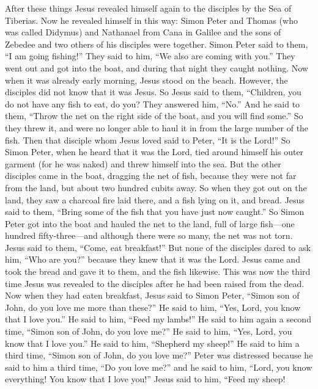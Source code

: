 \begin{biblechapter} %
 After these things Jesus revealed himself again to the disciples by the Sea of Tiberias. Now he revealed himself in this way:
\verse Simon Peter and Thomas (who was called Didymus) and Nathanael from Cana in Galilee and the sons of Zebedee and two others of his disciples were together.
\verse Simon Peter said to them, “I am going fishing!” They said to him, “We also are coming with you.” They went out and got into the boat, and during that night they caught nothing.
\verse Now when it was already early morning, Jesus stood on the beach. However, the disciples did not know that it was Jesus.
\verse So Jesus said to them, “Children, you do not have any fish to eat, do you? They answered him, “No.”
\verse And he said to them, “Throw the net on the right side of the boat, and you will find some.” So they threw it, and were no longer able to haul it in from the large number of the fish.
\verse Then that disciple whom Jesus loved said to Peter, “It is the Lord!” So Simon Peter, when he heard that it was the Lord, tied around himself his outer garment (for he was naked) and threw himself into the sea.
\verse But the other disciples came in the boat, dragging the net of fish, because they were not far from the land, but about two hundred cubits away.
\verse So when they got out on the land, they saw a charcoal fire laid there, and a fish lying on it, and bread.
\verse Jesus said to them, “Bring some of the fish that you have just now caught.”
\verse So Simon Peter got into the boat and hauled the net to the land, full of large fish—one hundred fifty-three—and although there were so many, the net was not torn.
\verse Jesus said to them, “Come, eat breakfast!” But none of the disciples dared to ask him, “Who are you?” because they knew that it was the Lord.
\verse Jesus came and took the bread and gave it to them, and the fish likewise.
\verse This was now the third time Jesus was revealed to the disciples after he had been raised from the dead.
 Now when they had eaten breakfast, Jesus said to Simon Peter, “Simon son of John, do you love me more than these?” He said to him, “Yes, Lord, you know that I love you.” He said to him, “Feed my lambs!”
\verse He said to him again a second time, “Simon son of John, do you love me?” He said to him, “Yes, Lord, you know that I love you.” He said to him, “Shepherd my sheep!”
\verse He said to him a third time, “Simon son of John, do you love me?” Peter was distressed because he said to him a third time, “Do you love me?” and he said to him, “Lord, you know everything! You know that I love you!” Jesus said to him, “Feed my sheep!

\end{biblechapter}
